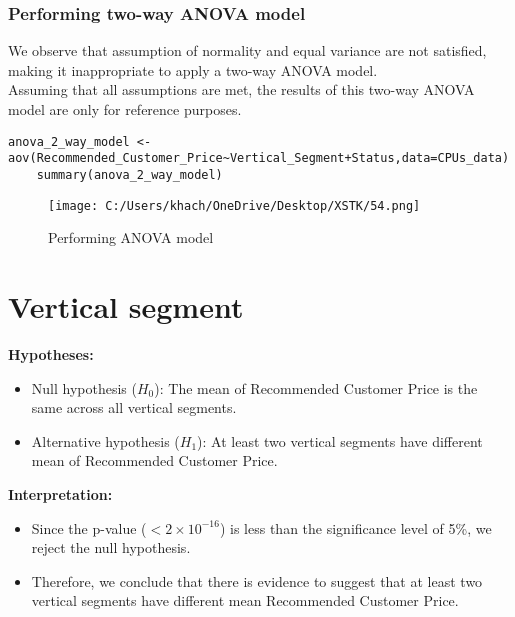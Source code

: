 \documentclass[a4paper]{article}
\begin{document}
	\subsubsection{Performing two-way ANOVA model}
	We observe that assumption of normality and equal variance are not satisfied, making it inappropriate to apply a two-way ANOVA model.\\
	Assuming that all assumptions are met, the results of this two-way ANOVA model are only for reference purposes.
	\begin{lstlisting}[frame=single, backgroundcolor=\color{gray!10}, breaklines=true, columns=fullflexible]
	anova_2_way_model <- aov(Recommended_Customer_Price~Vertical_Segment+Status,data=CPUs_data)
	summary(anova_2_way_model)
	\end{lstlisting}
		\begin{figure}[htbp]
		\centering
		\begin{adjustbox}{width=0.7\textwidth, frame}
			\texttt{[image: C:/Users/khach/OneDrive/Desktop/XSTK/54.png]}
		\end{adjustbox}
		\captionsetup{justification=centering}
		\vspace{0.5cm}
		\caption{Performing ANOVA model}
	\end{figure}
	\section*{Vertical segment}
	\textbf{Hypotheses:}
	\begin{itemize}
		\item Null hypothesis (\(H_0\)): The mean of Recommended Customer Price is the same across all vertical segments.
		\item Alternative hypothesis (\(H_1\)): At least two vertical segments have different mean of Recommended Customer Price.
	\end{itemize}
	\textbf{Interpretation:}
	\begin{itemize}
		\item Since the p-value (\( < 2 \times 10^{-16} \)) is less than the significance level of 5\%, we reject the null hypothesis.
		\item Therefore, we conclude that there is evidence to suggest that at least two vertical segments have different mean Recommended Customer Price.
	\end{itemize}
\end{document}

